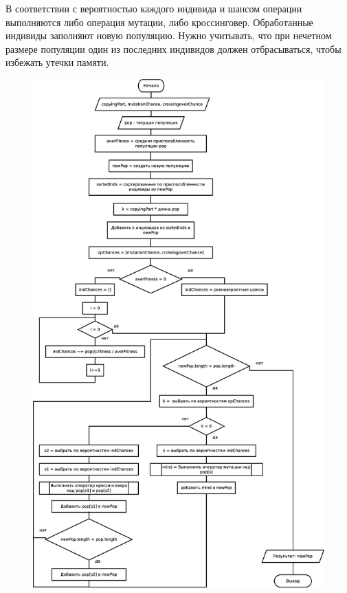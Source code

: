 \documentclass[russian,utf8,emptystyle]{eskdtext}
\begin{document}
\begin{spacing}{1.5}
В соответствии с вероятностью каждого индивида и шансом операции выполняются либо операция мутации, либо кроссинговер. Обработанные индивиды заполняют новую популяцию. Нужно учитывать, что при нечетном размере популяции один из последних индивидов должен отбрасываться, чтобы избежать утечки памяти.

\clearpage
\begin{figure}[h!]
\centering
\includegraphics[height=0.9\textheight]{form_next_population_alg.eps}
\end{figure}
\newpage


\end{spacing}
\end{document}
